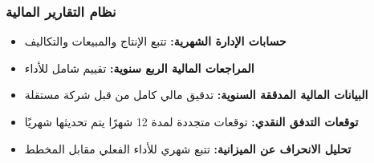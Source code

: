 \subsubsection{نظام التقارير المالية}
\begin{itemize}
    \item \textbf{حسابات الإدارة الشهرية:} تتبع الإنتاج والمبيعات والتكاليف
    \item \textbf{المراجعات المالية الربع سنوية:} تقييم شامل للأداء
    \item \textbf{البيانات المالية المدققة السنوية:} تدقيق مالي كامل من قبل شركة مستقلة
    \item \textbf{توقعات التدفق النقدي:} توقعات متجددة لمدة 12 شهرًا يتم تحديثها شهريًا
    \item \textbf{تحليل الانحراف عن الميزانية:} تتبع شهري للأداء الفعلي مقابل المخطط
\end{itemize}
